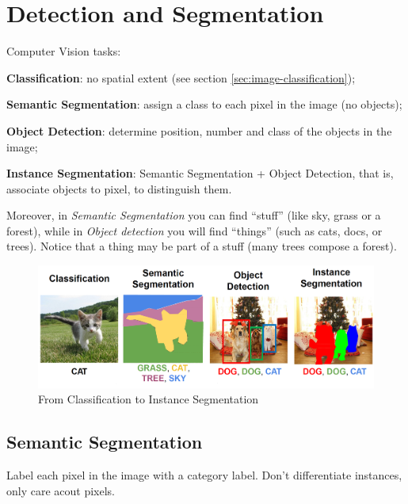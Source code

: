 \section{Detection and Segmentation}\label{sec:detection-segmentation}

Computer Vision tasks:
\begin{myitem}
    \item \textbf{Classification}: no spatial extent (see section \ref{sec:image-classification});
    \item \textbf{Semantic Segmentation}: assign a class to each pixel in the image (no objects);
    \item \textbf{Object Detection}: determine position, number and class of the objects in the image;
    \item \textbf{Instance Segmentation}: Semantic Segmentation + Object Detection, that is, associate objects to pixel, to distinguish them.
\end{myitem}

Moreover, in \textit{Semantic Segmentation} you can find ``stuff'' (like sky, grass or a forest), while in \textit{Object detection} you will find ``things'' (such as cats, docs, or trees). Notice that a thing may be part of a stuff (many trees compose a forest).

\begin{figure}[h!]
    \centering
    \includegraphics[width=.9\linewidth]{images/detection-segmentation}
    \caption[From Classification to Instance Segmentation]{From Classification to Instance Segmentation}
    \label{fig:detection-segmentation}
\end{figure}


\subsection{Semantic Segmentation}\label{sec:ds-segmentation}

Label each pixel in the image with a category label. Don't differentiate instances, only care acout pixels.

